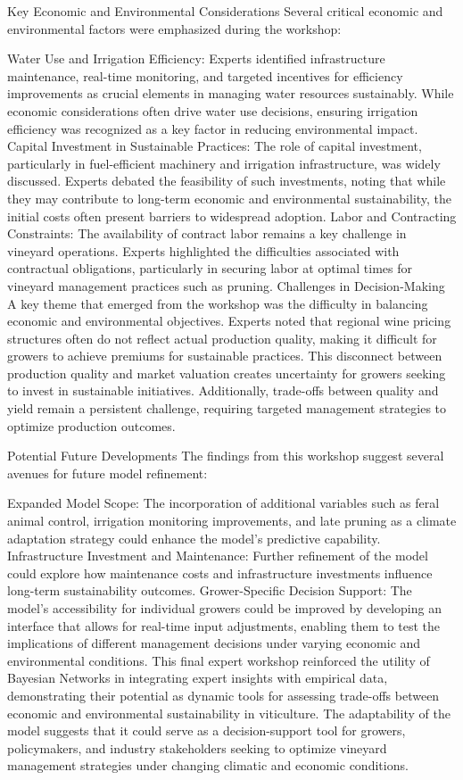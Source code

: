 \documentclass{article}
\begin{document}
Key Economic and Environmental Considerations
Several critical economic and environmental factors were emphasized during the workshop:

Water Use and Irrigation Efficiency: Experts identified infrastructure maintenance, real-time monitoring, and targeted incentives for efficiency improvements as crucial elements in managing water resources sustainably. While economic considerations often drive water use decisions, ensuring irrigation efficiency was recognized as a key factor in reducing environmental impact.
Capital Investment in Sustainable Practices: The role of capital investment, particularly in fuel-efficient machinery and irrigation infrastructure, was widely discussed. Experts debated the feasibility of such investments, noting that while they may contribute to long-term economic and environmental sustainability, the initial costs often present barriers to widespread adoption.
Labor and Contracting Constraints: The availability of contract labor remains a key challenge in vineyard operations. Experts highlighted the difficulties associated with contractual obligations, particularly in securing labor at optimal times for vineyard management practices such as pruning.
Challenges in Decision-Making
A key theme that emerged from the workshop was the difficulty in balancing economic and environmental objectives. Experts noted that regional wine pricing structures often do not reflect actual production quality, making it difficult for growers to achieve premiums for sustainable practices. This disconnect between production quality and market valuation creates uncertainty for growers seeking to invest in sustainable initiatives. Additionally, trade-offs between quality and yield remain a persistent challenge, requiring targeted management strategies to optimize production outcomes.

Potential Future Developments
The findings from this workshop suggest several avenues for future model refinement:

Expanded Model Scope: The incorporation of additional variables such as feral animal control, irrigation monitoring improvements, and late pruning as a climate adaptation strategy could enhance the model’s predictive capability.
Infrastructure Investment and Maintenance: Further refinement of the model could explore how maintenance costs and infrastructure investments influence long-term sustainability outcomes.
Grower-Specific Decision Support: The model's accessibility for individual growers could be improved by developing an interface that allows for real-time input adjustments, enabling them to test the implications of different management decisions under varying economic and environmental conditions.
This final expert workshop reinforced the utility of Bayesian Networks in integrating expert insights with empirical data, demonstrating their potential as dynamic tools for assessing trade-offs between economic and environmental sustainability in viticulture. The adaptability of the model suggests that it could serve as a decision-support tool for growers, policymakers, and industry stakeholders seeking to optimize vineyard management strategies under changing climatic and economic conditions.
\end{document}
